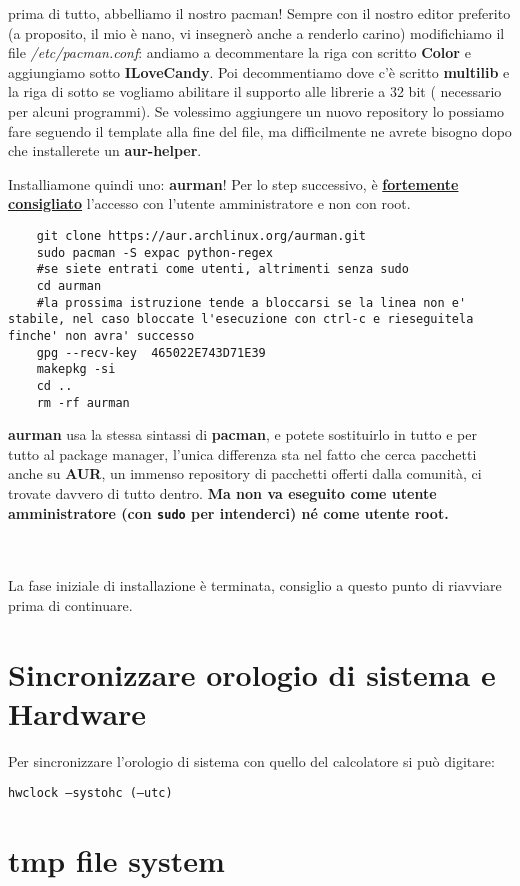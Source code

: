 \documentclass[twoside,italian]{book}
\newcommand{\nlinea}{
	\leavevmode
	\\
}
\newcommand{\centcode}[1]{
	
	\definecolor{centcode}{rgb}{0.5,0.1,0.1}
	
	\begin{center}
	 	\texttt{\textcolor{centcode}{#1}}
	\end{center}
	
	
}
\newcommand{\code}[1]{
	\texttt{\textcolor{code}{#1}}
}
\begin{document}
			prima di tutto, abbelliamo il nostro pacman!
			Sempre con il nostro editor preferito (a proposito, il mio è nano, vi insegnerò anche a renderlo carino) modifichiamo il file \textit{/etc/pacman.conf}: andiamo a decommentare la riga con scritto \textbf{Color} e aggiungiamo sotto \textbf{ILoveCandy}.
			Poi decommentiamo dove c'è scritto \textbf{multilib} e la riga di sotto se vogliamo abilitare il supporto alle librerie a 32 bit ( necessario per alcuni programmi).
			Se volessimo aggiungere un nuovo repository lo possiamo fare seguendo il template alla fine del file, ma difficilmente ne avrete bisogno dopo che installerete un \textbf{aur-helper}.

			Installiamone quindi uno: \textbf{aurman}!
			Per lo step successivo, è \underline{\textbf{fortemente consigliato}} l'accesso con l'utente amministratore e non con root.

\begin{lstlisting}
	git clone https://aur.archlinux.org/aurman.git
	sudo pacman -S expac python-regex
	#se siete entrati come utenti, altrimenti senza sudo
	cd aurman
	#la prossima istruzione tende a bloccarsi se la linea non e' stabile, nel caso bloccate l'esecuzione con ctrl-c e rieseguitela finche' non avra' successo
	gpg --recv-key  465022E743D71E39
	makepkg -si
	cd ..
	rm -rf aurman
\end{lstlisting}

			\textbf{aurman} usa la stessa sintassi di \textbf{pacman}, e potete sostituirlo in tutto e per tutto al package manager, l'unica differenza sta nel fatto che cerca pacchetti anche su \textbf{AUR}, un immenso repository di pacchetti offerti dalla comunità, ci trovate davvero di tutto dentro. \textbf{Ma non va eseguito come utente amministratore (con \code{sudo} per intenderci) né come utente root.}
\nlinea
	\nlinea
			La fase iniziale di installazione è terminata, consiglio a questo punto di riavviare prima di continuare.
			
			
		\section{Sincronizzare orologio di sistema e Hardware}
			
			Per sincronizzare l'orologio di sistema con quello del calcolatore si può digitare:\centcode{hwclock --systohc (--utc)}
			
		\section{tmp file system}
			
\end{document}
